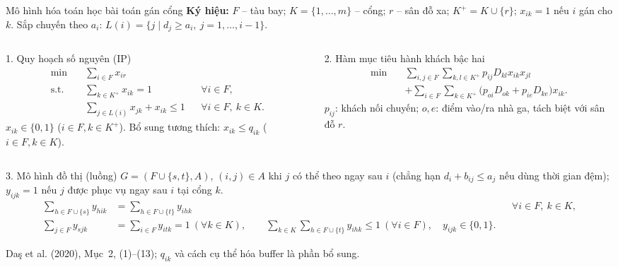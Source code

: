 \documentclass[aspectratio=169,10pt]{beamer}
\begin{document}
\begin{frame}[t]{Mô hình hóa toán học bài toán gán cổng}
\scriptsize
\setlength{\abovedisplayskip}{2pt}
\setlength{\belowdisplayskip}{2pt}
\setlength{\abovedisplayshortskip}{1pt}
\setlength{\belowdisplayshortskip}{1pt}
{\tiny\textbf{Ký hiệu:} $F$ -- tàu bay; $K=\{1,\ldots,m\}$ -- cổng;
$r$ -- sân đỗ xa; $K^+=K\cup\{r\}$; $x_{ik}=1$ nếu $i$ gán cho $k$.
Sắp chuyến theo $a_i$: $L(i)=\{j\mid d_j\geq a_i,\ j=1,\ldots,i-1\}$.}\par
\vspace{-0.8ex}
\begin{columns}[T,onlytextwidth]
\begin{column}{0.48\textwidth}
\begin{block}{1. Quy hoạch số nguyên (IP)}
\[
\begin{aligned}
\min\quad & \sum_{i\in F}x_{ir}\\[-0.45ex]
\text{s.t.}\quad
&\sum_{k\in K^+}x_{ik}=1 &&\forall i\in F,\\[-0.45ex]
&\sum_{j\in L(i)}x_{jk}+x_{ik}\leq1 &&\forall i\in F,\ k\in K.
\end{aligned}
\]
{\tiny $x_{ik}\in\{0,1\}$ ($i\in F,k\in K^+$). Bổ sung tương thích:
$x_{ik}\leq q_{ik}$ ($i\in F,k\in K$).}
\end{block}
\end{column}

\begin{column}{0.48\textwidth}
\begin{block}{2. Hàm mục tiêu hành khách bậc hai}
\[
\begin{aligned}
\min\quad
&\sum_{i,j\in F}\sum_{k,l\in K^+}
p_{ij}D_{kl}x_{ik}x_{jl}\\[-0.45ex]
&+\sum_{i\in F}\sum_{k\in K^+}
\bigl(p_{oi}D_{ok}+p_{ie}D_{ke}\bigr)x_{ik}.
\end{aligned}
\]
$p_{ij}$: khách nối chuyến; $o,e$: điểm vào/ra nhà ga, tách biệt với sân đỗ $r$.
\end{block}
\end{column}
\end{columns}

\vspace{-1.2ex}
\begin{block}{3. Mô hình đồ thị (luồng)}
$G=(F\cup\{s,t\},A)$, $(i,j)\in A$ khi $j$ có thể theo ngay sau $i$
(chẳng hạn $d_i+b_{ij}\leq a_j$ nếu dùng thời gian đệm);
$y_{ijk}=1$ nếu $j$ được phục vụ ngay sau $i$ tại cổng $k$.
{\tiny
\[
\begin{aligned}
\sum_{h\in F\cup\{s\}}y_{hik}&=\sum_{h\in F\cup\{t\}}y_{ihk}
&&\forall i\in F,\ k\in K,\\[-0.45ex]
\sum_{j\in F}y_{sjk}&=\sum_{i\in F}y_{itk}=1\ (\forall k\in K),\qquad
\sum_{k\in K}\sum_{h\in F\cup\{t\}}y_{ihk}\leq1\ (\forall i\in F),\quad y_{ijk}\in\{0,1\}.
\end{aligned}
\]
}
\end{block}

\vspace{-0.8ex}
\vfill
\tiny Da\c{s} et al. (2020), Mục~2, (1)--(13); $q_{ik}$ và cách cụ thể hóa buffer là phần bổ sung.
\end{frame}
\end{document}
